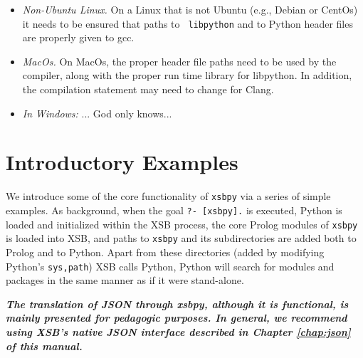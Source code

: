 \begin{itemize}
\item {\em Non-Ubuntu Linux.} On a Linux that is not Ubuntu (e.g.,
  Debian or CentOs) it needs to be ensured that paths to {\tt
    libpython} and to Python header files are properly given to gcc.
\item {\em MacOs.} On MacOs, the proper header file paths need to be
  used by the compiler, along with the proper run time library for
  libpython.  In addition, the compilation statement may need to
  change for Clang.
\item {\em In Windows:} ... God only knows...
\end{itemize}

\section{Introductory Examples}

We introduce some of the core functionality of {\tt xsbpy} via a
series of simple examples.  As background, when the goal {\tt ?-
  [xsbpy].} is executed, Python is loaded and initialized within the
XSB process, the core Prolog modules of {\tt xsbpy} is loaded into
XSB, and paths to {\tt xsbpy} and its subdirectories are added both to
Prolog and to Python.  Apart from these directories (added by
modifying Python's {\tt sys,path}) XSB calls Python, Python will
search for modules and packages in the same manner as if it were
stand-alone.

{\bf {\em The translation of JSON through xsbpy, although it is
    functional, is mainly presented for pedagogic purposes.  In
    general, we recommend using XSB's native JSON interface described
    in Chapter \ref{chap:json} of this manual.    }}

